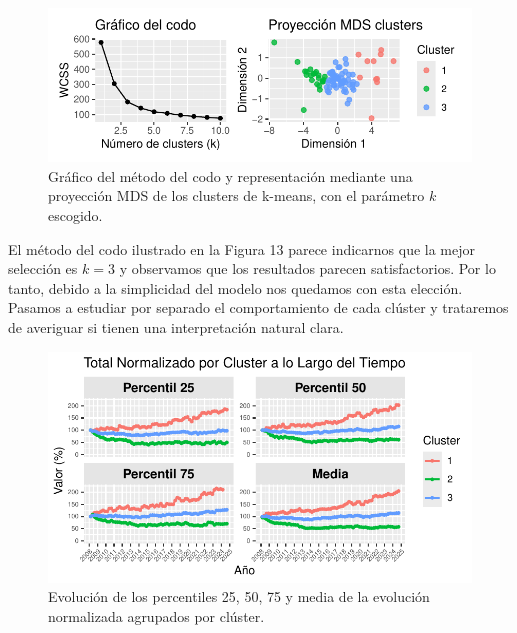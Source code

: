 \documentclass[Universitat de
València,article,submit,moreauthors,pdftex]{Definitions/mdpi}
\begin{document}
\begin{figure}

{\centering \includegraphics{ProyectoAED2024_files/figure-latex/unnamed-chunk-45-1} 

}

\caption{Gráfico del método del codo y representación mediante una proyección MDS de los clusters de k-means, con el parámetro $k$ escogido.}\label{fig:unnamed-chunk-45}
\end{figure}

El método del codo ilustrado en la Figura 13 parece indicarnos que la
mejor selección es \(k=3\) y observamos que los resultados parecen
satisfactorios. Por lo tanto, debido a la simplicidad del modelo nos
quedamos con esta elección. Pasamos a estudiar por separado el
comportamiento de cada clúster y trataremos de averiguar si tienen una
interpretación natural clara.

\begin{figure}

{\centering \includegraphics{ProyectoAED2024_files/figure-latex/unnamed-chunk-46-1} 

}

\caption{Evolución de los percentiles 25, 50, 75 y media de la evolución normalizada agrupados por clúster.}\label{fig:unnamed-chunk-46}
\end{figure}
\end{document}
